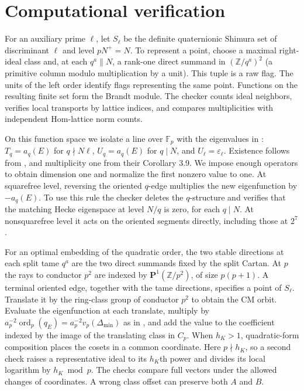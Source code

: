 \documentclass[11pt]{article}
\newcommand{\Z}{\mathbb Z}
\newcommand{\F}{\mathbb F}
\begin{document}
\section{Computational verification}
For an auxiliary prime $\ell$, let $S_\ell$ be the definite quaternionic Shimura set of discriminant $\ell$ and level $pN^+=N$. To represent a point, choose a maximal right-ideal class and, at each $q^a\parallel N$, a rank-one direct summand in $(\Z/q^a)^2$ (a primitive column modulo multiplication by a unit). This tuple is a raw flag. The units of the left order identify flags representing the same point. Functions on the resulting finite set form the Brandt module. The checker counts ideal neighbors, verifies local transports by lattice indices, and compares multiplicities with independent Hom-lattice norm counts.

On this function space we isolate a line over $\F_p$ with the eigenvalues in \cite[(18)]{FG}: $T_q=a_q(E)$ for $q\nmid N\ell$, $U_q=a_q(E)$ for $q\mid N$, and $U_\ell=\varepsilon_\ell$. Existence follows from \cite[\S3.3.1 and proof of Theorem 3.16]{FG}, and multiplicity one from their Corollary 3.9. We impose enough operators to obtain dimension one and normalize the first nonzero value to one. At squarefree level, reversing the oriented $q$-edge multiplies the new eigenfunction by $-a_q(E)$. To use this rule the checker deletes the $q$-structure and verifies that the matching Hecke eigenspace at level $N/q$ is zero, for each $q\mid N$. At nonsquarefree level it acts on the oriented segments directly, including those at $2^7$.

For an optimal embedding of the quadratic order, the two stable directions at each split tame $q^a$ are the two direct summands fixed by the split Cartan. At $p$ the rays to conductor $p^2$ are indexed by $\mathbf P^1(\Z/p^2)$, of size $p(p+1)$. A terminal oriented edge, together with the tame directions, specifies a point of $S_\ell$. Translate it by the ring-class group of conductor $p^2$ to obtain the CM orbit. Evaluate the eigenfunction at each translate, multiply by $a_p^{-2}\operatorname{ord}_p(q_E)=a_p^{-2}v_p(\Delta_{\min})$ as in \cite[(24) and Definition 3.14]{FG}, and add the value to the coefficient indexed by the image of the translating class in $C_p$.
When $h_K>1$, quadratic-form composition places the cosets in a common coordinate. Here $p\nmid h_K$, so a second check raises a representative ideal to its $h_K$th power and divides its local logarithm by $h_K\bmod p$. The checks compare full vectors under the allowed changes of coordinates. A wrong class offset can preserve both $A$ and $B$.
\end{document}
